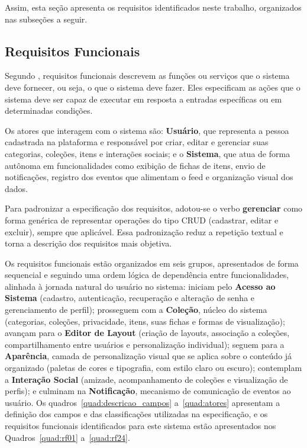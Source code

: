 Assim, esta seção apresenta os requisitos identificados neste trabalho, organizados nas subseções a seguir.


\subsection{Requisitos Funcionais}

Segundo , requisitos funcionais descrevem as funções ou serviços que o sistema deve fornecer, ou seja, o que o sistema deve fazer. 
Eles especificam as ações que o sistema deve ser capaz de executar em resposta a entradas específicas ou em determinadas condições.

Os atores que interagem com o sistema são: \textbf{Usuário}, que representa a pessoa cadastrada na plataforma e responsável por criar, editar e gerenciar suas categorias, 
coleções, itens e interações sociais; e o \textbf{Sistema}, que atua de forma autônoma em funcionalidades como exibição de fichas de itens, envio de notificações, 
registro dos eventos que alimentam o feed e organização visual dos dados.

Para padronizar a especificação dos requisitos, adotou-se o verbo \textbf{gerenciar} como forma genérica de representar operações do tipo CRUD (cadastrar, editar e excluir), 
sempre que aplicável. Essa padronização reduz a repetição textual e torna a descrição dos requisitos mais objetiva.

Os requisitos funcionais estão organizados em seis grupos, apresentados de forma sequencial e seguindo uma ordem lógica de dependência entre funcionalidades, 
alinhada à jornada natural do usuário no sistema: iniciam pelo \textbf{Acesso ao Sistema} (cadastro, autenticação, recuperação e alteração de senha e gerenciamento de perfil); prosseguem com a \textbf{Coleção}, núcleo do sistema (categorias, coleções, privacidade, itens, suas fichas e formas de visualização); avançam para o \textbf{Editor de Layout} (criação de layouts, associação a coleções, compartilhamento entre usuários e personalização individual); seguem para a \textbf{Aparência}, camada de personalização visual que se aplica sobre o conteúdo já organizado (paletas de cores e tipografia, com estilo claro ou escuro); contemplam a \textbf{Interação Social} (amizade, acompanhamento de coleções e visualização de perfis); e culminam na \textbf{Notificação}, mecanismo de comunicação de eventos ao usuário.
Os quadros~\ref{quad:descricao_campos} a~\ref{quad:atores} apresentam a definição dos campos e das classificações utilizadas na especificação, e os requisitos funcionais 
identificados para este sistema estão apresentados nos Quadros~\ref{quad:rf01} a~\ref{quad:rf24}.


